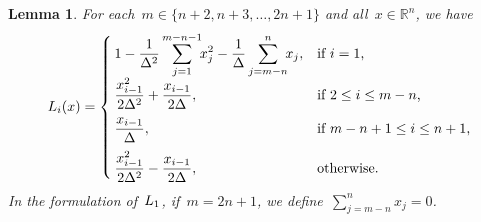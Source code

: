 \documentclass{article}
\numberwithin{equation}{section}
\theoremstyle{definition}
\theoremstyle{plain}
\newtheorem{lemma}{Lemma}[section]
\theoremstyle{remark}
\newcommand*{\lagp}[1][]{L\ifblank{#1}{}{_{#1}}}
\newcommand*{\R}{\mathbb{R}}
\newcommand*{\set}[2][]{#1\{#2#1\}}
\begin{document}
\begin{lemma}
    \label{lem:lagp}
    For each~$m \in \set{n + 2, n + 3, \dots,  2n + 1}$ and all~$x \in \R^n$, we have
    \begin{equation*}
        \lagp[i](x) =
        \begin{cases}
            \displaystyle 1 - \frac{1}{\Delta^2} \sum_{j = 1}^{m - n - 1} \!\! x_j^2 - \frac{1}{\Delta} \sum_{j = m - n}^n \!\! x_j,    & \text{if~$i = 1$,}\\[2ex]
            \displaystyle \frac{x_{i - 1}^2}{2\Delta^2} + \frac{x_{i - 1}}{2\Delta},                                                    & \text{if~$2 \le i \le m - n$,}\\[2ex]
            \displaystyle \frac{x_{i - 1}}{\Delta},                                                                                     & \text{if~$m - n + 1 \le i \le n + 1$,}\\[2ex]
            \displaystyle \frac{x_{i - 1}^2}{2\Delta^2} - \frac{x_{i - 1}}{2\Delta},                                                    & \text{otherwise.}
        \end{cases}
    \end{equation*}
    In the formulation of~$\lagp[1]$, if~$m = 2n + 1$, we define~$\sum_{j = m - n}^n x_j = 0$.
\end{lemma}
\end{document}
